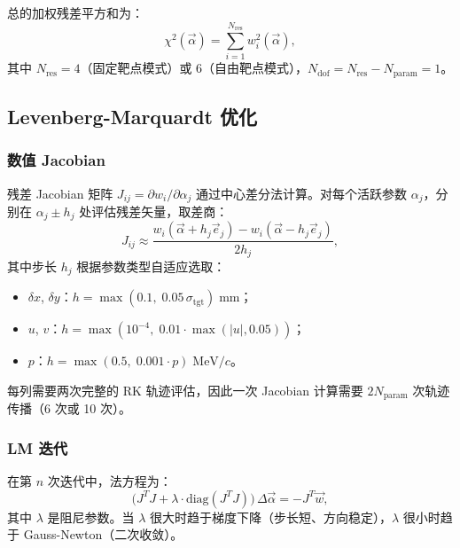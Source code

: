 \documentclass[a4paper, 11pt]{article}
\begin{document}
总的加权残差平方和为：
\begin{equation}
  \chi^2(\vec{\alpha}) = \sum_{i=1}^{N_\mathrm{res}} w_i^2(\vec{\alpha}),
  \label{eq:chi2}
\end{equation}
其中 $N_\mathrm{res} = 4$（固定靶点模式）或 $6$（自由靶点模式），$N_\mathrm{dof} = N_\mathrm{res} - N_\mathrm{param} = 1$。

\subsection{Levenberg-Marquardt 优化}
\label{sec:lm}

\subsubsection{数值 Jacobian}

残差 Jacobian 矩阵 $J_{ij} = \partial w_i / \partial \alpha_j$ 通过中心差分法计算。对每个活跃参数 $\alpha_j$，分别在 $\alpha_j \pm h_j$ 处评估残差矢量，取差商：
\begin{equation}
  J_{ij} \approx \frac{w_i(\vec{\alpha} + h_j \vec{e}_j) - w_i(\vec{\alpha} - h_j \vec{e}_j)}{2h_j},
\end{equation}
其中步长 $h_j$ 根据参数类型自适应选取：
\begin{itemize}[nosep]
  \item $\delta x$, $\delta y$：$h = \max(0.1,\; 0.05\,\sigma_\mathrm{tgt})\;\mathrm{mm}$；
  \item $u$, $v$：$h = \max(10^{-4},\; 0.01 \cdot \max(|u|, 0.05))$；
  \item $p$：$h = \max(0.5,\; 0.001 \cdot p)\;\mathrm{MeV}/c$。
\end{itemize}

每列需要两次完整的 RK 轨迹评估，因此一次 Jacobian 计算需要 $2 N_\mathrm{param}$ 次轨迹传播（6 次或 10 次）。

\subsubsection{LM 迭代}

在第 $n$ 次迭代中，法方程为：
\begin{equation}
  \bigl(J^T J + \lambda \cdot \mathrm{diag}(J^T J)\bigr)\,\Delta\vec{\alpha}
  = -J^T \vec{w},
  \label{eq:lm_normal}
\end{equation}
其中 $\lambda$ 是阻尼参数。当 $\lambda$ 很大时趋于梯度下降（步长短、方向稳定），$\lambda$ 很小时趋于 Gauss-Newton（二次收敛）。
\end{document}
